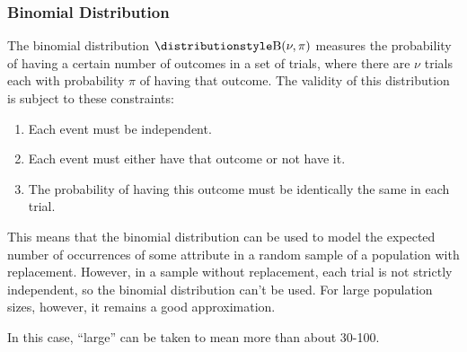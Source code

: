 \subsubsection{Binomial Distribution}


The binomial distribution \(\Binomial(\nu, \pi)\) measures the probability
of having a certain number of outcomes in a set of trials,  where there are
\(\nu\) trials each with probability \(\pi\) of having that outcome.
The validity of this distribution is subject to these constraints:
\begin{enumerate}
 \item Each event must be independent.
 \item Each event must either have that outcome or not have it.
 \item The probability of having this outcome must be identically the same in
       each trial.
\end{enumerate}
This means that the binomial distribution can be used to model the expected
number of occurrences of some attribute in a random sample of a population
with replacement. However, in a sample without replacement, each trial is
not strictly independent, so the binomial distribution can't be used. For
large population sizes, however, it remains a good approximation.

In this case, ``large'' can be taken to mean more than about 30-100.

